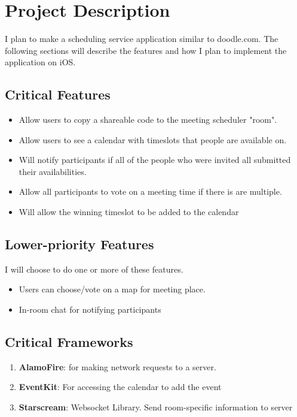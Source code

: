 \documentclass[11pt]{article}
\author{Andrew Chen}
\date{\today}
\title{}
\begin{document}
\tableofcontents

\section{Project Description}
\label{sec:org04570ce}

I plan to make a scheduling service application similar to doodle.com. The following sections will
describe the features and how I plan to implement the application on iOS.

\subsection{Critical Features}
\label{sec:orged7d666}

\begin{itemize}
\item Allow users to copy a shareable code to the meeting scheduler "room".
\item Allow users to see a calendar with timeslots that people are available on.
\item Will notify participants if all of the people who were invited all submitted their availabilities.
\item Allow all participants to vote on a meeting time if there is are multiple.
\item Will allow the winning timeslot to be added to the calendar
\end{itemize}

\subsection{Lower-priority Features}
\label{sec:org0ba78d7}

I will choose to do one or more of these features.

\begin{itemize}
\item Users can choose/vote on a map for meeting place.
\item In-room chat for notifying participants
\end{itemize}

\subsection{Critical Frameworks}
\label{sec:org1f6a2cc}

\begin{enumerate}
\item \textbf{AlamoFire}: for making network requests to a server.
\item \textbf{EventKit}: For accessing the calendar to add the event
\item \textbf{Starscream}: Websocket Library. Send room-specific information to server
\end{enumerate}
\end{document}
